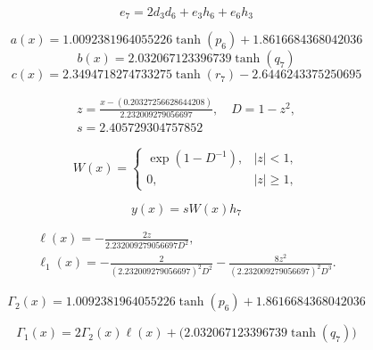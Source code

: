 \begin{equation}
e_{7}=2 d_{3} d_{6} + e_{3} h_{6} + e_{6} h_{3}
\end{equation}


\begin{equation}
a(x)=1.0092381964055226 \tanh{\left(p_{6} \right)} + 1.8616684368042036
\end{equation}
\begin{equation}
b(x)=2.032067123396739 \tanh{\left(q_{7} \right)}
\end{equation}
\begin{equation}
c(x)=2.3494718274733275 \tanh{\left(r_{7} \right)} - 2.6446243375250695
\end{equation}


\begin{equation}
\begin{aligned}z=\frac{x-(0.20327256628644208)}{2.232009279056697},\quad D=1-z^2,\\s=2.405729304757852\end{aligned}
\end{equation}


\begin{equation}
W(x)=\begin{cases}\exp(1-D^{-1}),&|z|<1,\\0,&|z|\ge1,\end{cases}
\end{equation}


\begin{equation}\label{eq:ex4-solution}
y(x)=sW(x)h_{7}
\end{equation}


\begin{equation}
\begin{aligned}\ell(x)=-\frac{2z}{2.232009279056697D^2},\\\ell_1(x)=-\frac{2}{(2.232009279056697)^2D^2}-\frac{8z^2}{(2.232009279056697)^2D^3}.\end{aligned}
\end{equation}


\begin{equation}
\Gamma_2(x)=1.0092381964055226 \tanh{\left(p_{6} \right)} + 1.8616684368042036
\end{equation}


\begin{equation}
\Gamma_1(x)=2\Gamma_2(x)\ell(x)+\bigl(2.032067123396739 \tanh{\left(q_{7} \right)}\bigr)
\end{equation}



